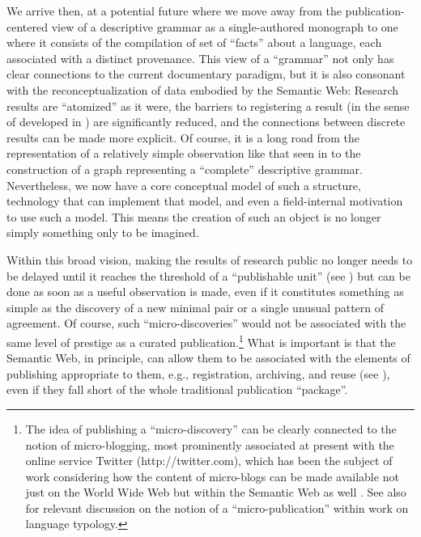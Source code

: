 We arrive then, at a potential future where we move away from the
publication-centered view of a descriptive grammar as a single-authored
monograph to one where it consists of the compilation of set of ``facts'' about
a language, each associated with a distinct provenance. This view of a
``grammar'' not only has clear connections to the current documentary paradigm,
but it is also consonant with the reconceptualization of data embodied by the
Semantic Web: Research results are ``atomized'' as it were, the barriers to
registering a result (in the sense of developed in ) are significantly
reduced, and the connections between discrete results can be made more explicit.
Of course, it is a long road from the representation of a relatively simple
observation like that seen in  to the construction of a graph
representing a ``complete'' descriptive grammar. Nevertheless, we now have a
core conceptual model of such a structure, technology that can implement that
model, and even a field-internal motivation to use such a model. This
means the creation of such an object is no longer simply something only
to be imagined.

Within this broad vision, making the results of research public no longer needs
to be delayed until it reaches the threshold of a ``publishable unit'' (see
) but can be done as soon as a useful observation is made,
even if it constitutes something as simple as the discovery of a new minimal
pair or a single unusual pattern of agreement. Of course, such
``micro-discoveries'' would not be associated with the same level of prestige as
a curated publication.{\footnote{The idea of publishing a ``micro-discovery''
can be clearly connected to the notion of micro-blogging, most prominently
associated at present with the online service Twitter (http://twitter.com),
which has been the subject of work considering how the content of micro-blogs
can be made available not just on the World Wide Web but within the Semantic Web
as well \citep{PassantEtAl:2010}. See also  for
relevant discussion on the notion of a ``micro-publication'' within work on
language typology.}} What is important is that the Semantic Web, in principle,
can allow them to be associated with the elements of publishing appropriate to
them, e.g., registration, archiving, and reuse (see ), even if
they fall short of the whole traditional publication ``package''.

